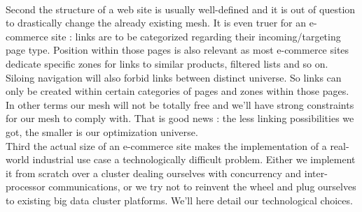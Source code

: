 \documentclass{iSWAGArticle}
\begin{document}
  \\
  \indent
  Second the structure of a web site is usually well-defined and it is out of question to drastically change the already existing mesh.
  It is even truer for an e-commerce site : links are to be categorized regarding their incoming/targeting page type. Position within those pages
  is also relevant as most e-commerce sites dedicate specific zones for links to similar products, filtered lists and so on. Siloing navigation will also forbid links between distinct universe.
  So links can only be created within certain categories of pages and zones within those pages. In other terms our mesh will not be totally free and 
  we'll have strong constraints for our mesh to comply with. That is good news : the less linking possibilities we got, the smaller is our optimization universe.
  \\
  \indent
  Third the actual size of an e-commerce site makes the implementation of a real-world industrial use case a technologically difficult problem.
  Either we implement it from scratch over a cluster dealing ourselves with concurrency and inter-processor communications,
  or we try not to reinvent the wheel and plug ourselves to existing big data cluster platforms. We'll here detail our technological choices.
\end{document}
